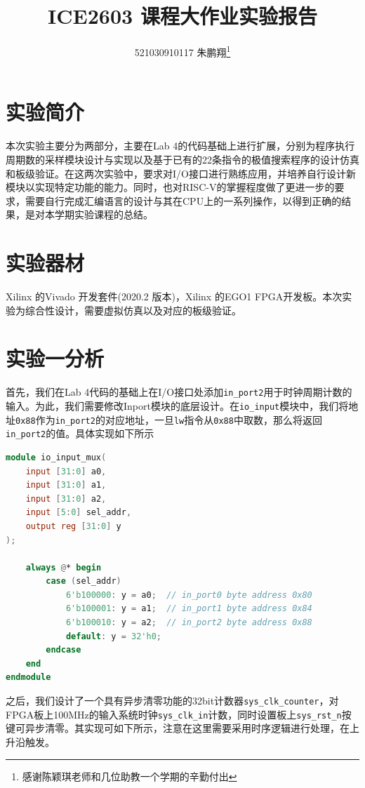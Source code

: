 \documentclass[a4paper,12pt]{article}
\title{ICE2603 课程大作业实验报告}
\author{521030910117 朱鹏翔\footnote{感谢陈颖琪老师和几位助教一个学期的辛勤付出}}
\begin{document}
    \maketitle

    \section{实验简介}

    本次实验主要分为两部分，主要在Lab 4的代码基础上进行扩展，分别为程序执行周期数的采样模块设计与实现以及基于已有的22条指令的极值搜索程序的设计仿真和板级验证。在这两次实验中，要求对I/O接口进行熟练应用，并培养自行设计新模块以实现特定功能的能力。同时，也对RISC-V的掌握程度做了更进一步的要求，需要自行完成汇编语言的设计与其在CPU上的一系列操作，以得到正确的结果，是对本学期实验课程的总结。

    \section{实验器材}

    Xilinx 的Vivado 开发套件(2020.2 版本)，Xilinx 的EGO1 FPGA开发板。本次实验为综合性设计，需要虚拟仿真以及对应的板级验证。

    \section{实验一分析}

    首先，我们在Lab 4代码的基础上在I/O接口处添加\verb|in_port2|用于时钟周期计数的输入。为此，我们需要修改Inport模块的底层设计。在\verb|io_input|模块中，我们将地址\verb|0x88|作为\verb|in_port2|的对应地址，一旦\verb|lw|指令从\verb|0x88|中取数，那么将返回\verb|in_port2|的值。具体实现如下所示

    \begin{lstlisting}[language=verilog]
module io_input_mux(
    input [31:0] a0,
    input [31:0] a1,
    input [31:0] a2,
    input [5:0] sel_addr,
    output reg [31:0] y
);

    always @* begin
        case (sel_addr)
            6'b100000: y = a0;  // in_port0 byte address 0x80
            6'b100001: y = a1;  // in_port1 byte address 0x84
            6'b100010: y = a2;  // in_port2 byte address 0x88
            default: y = 32'h0;
        endcase
    end
endmodule
    \end{lstlisting}

    之后，我们设计了一个具有异步清零功能的32bit计数器\verb|sys_clk_counter|，对FPGA板上100MHz的输入系统时钟\verb|sys_clk_in|计数，同时设置板上\verb|sys_rst_n|按键可异步清零。其实现可如下所示，注意在这里需要采用时序逻辑进行处理，在上升沿触发。
\end{document}
